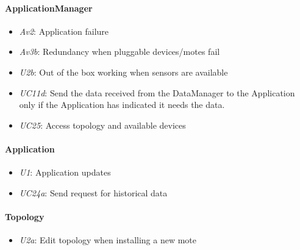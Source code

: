 \documentclass[english]{sareport}
\begin{document}
\paragraph{ApplicationManager}
\begin{itemize}
	\item \emph{Av2}: Application failure
	\item \emph{Av3b}: Redundancy when pluggable devices/motes fail 
	\item \emph{U2b}: Out of the box working when sensors are available
	\item \emph{UC11d}: Send the data received from the DataManager to the Application only if the Application has indicated it needs the data.
	\item \emph{UC25}: Access topology and available devices
\end{itemize}

\paragraph{Application}
\begin{itemize}
	\item \emph{U1}: Application updates
	\item \emph{UC24a}: Send request for historical data
\end{itemize}

\paragraph{Topology}
\begin{itemize}
	\item \emph{U2a}: Edit topology when installing a new mote
\end{itemize}
\end{document}
